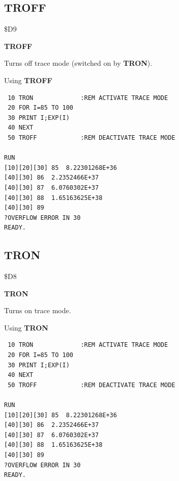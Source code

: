 \subsection{TROFF}
\begin{description}[leftmargin=2cm,style=nextline]
\item [Token:] \$D9
\item [Format:] {\bf TROFF}
\item [Usage:]  Turns off trace mode (switched on by {\bf TRON}).

\item [Example:] Using {\bf TROFF}
\begin{tcolorbox}[colback=black,coltext=white]
\verbatimfont{\codefont}
\begin{verbatim}
 10 TRON             :REM ACTIVATE TRACE MODE
 20 FOR I=85 TO 100
 30 PRINT I;EXP(I)
 40 NEXT
 50 TROFF            :REM DEACTIVATE TRACE MODE

RUN
[10][20][30] 85  8.22301268E+36
[40][30] 86  2.2352466E+37
[40][30] 87  6.0760302E+37
[40][30] 88  1.65163625E+38
[40][30] 89
?OVERFLOW ERROR IN 30
READY.
\end{verbatim}
\end{tcolorbox}
\end{description}


\newpage
\subsection{TRON}
\begin{description}[leftmargin=2cm,style=nextline]
\item [Token:] \$D8
\item [Format:] {\bf TRON}
\item [Usage:]  Turns on trace mode.

\item [Example:] Using {\bf TRON}
\begin{tcolorbox}[colback=black,coltext=white]
\verbatimfont{\codefont}
\begin{verbatim}
 10 TRON             :REM ACTIVATE TRACE MODE
 20 FOR I=85 TO 100
 30 PRINT I;EXP(I)
 40 NEXT
 50 TROFF            :REM DEACTIVATE TRACE MODE

RUN
[10][20][30] 85  8.22301268E+36
[40][30] 86  2.2352466E+37
[40][30] 87  6.0760302E+37
[40][30] 88  1.65163625E+38
[40][30] 89
?OVERFLOW ERROR IN 30
READY.
\end{verbatim}
\end{tcolorbox}
\end{description}

